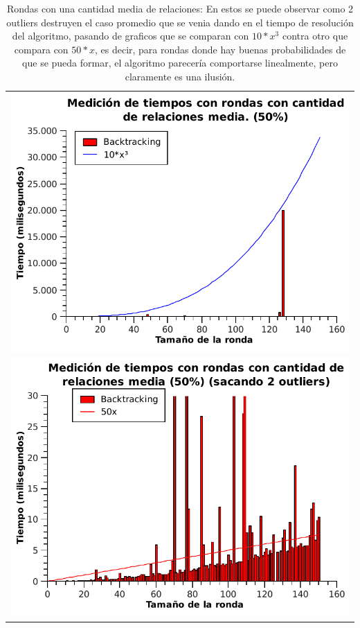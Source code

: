 	\begin{table}[h!] %
		\centering %
			\begin{tabular}{c}
				\includegraphics[scale=0.7]{../Ej_2/Otros/Graficos/Graph50-1.pdf} \\
				\includegraphics[scale=0.7]{../Ej_2/Otros/Graficos/Graph50-2.pdf}
			\end{tabular}
			\caption{Rondas con una cantidad media de relaciones: En estos se puede observar como 2 outliers destruyen el caso promedio que se venia dando en el tiempo de resolución del algoritmo, pasando de graficos que se comparan con $10*x^3$ contra otro que compara con $50*x$, es decir, para rondas donde hay buenas probabilidades de que se pueda formar, el algoritmo parecería comportarse linealmente, pero claramente es una ilusión.} %
			\label{tiempoEj2b} %
	\end{table}

